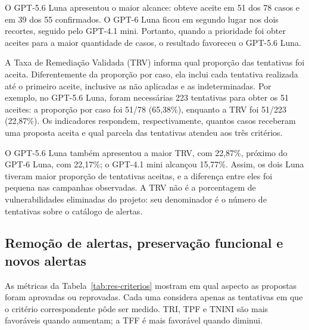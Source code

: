 O GPT-5.6 Luna apresentou o maior alcance: obteve aceite em 51 dos 78 casos e em 39 dos 55 confirmados. O GPT-6 Luna ficou em segundo lugar nos dois recortes, seguido pelo GPT-4.1 mini. Portanto, quando a prioridade foi obter aceites para a maior quantidade de casos, o resultado favoreceu o GPT-5.6 Luna.

A Taxa de Remediação Validada (TRV) informa qual proporção das tentativas foi aceita. Diferentemente da proporção por caso, ela inclui cada tentativa realizada até o primeiro aceite, inclusive as não aplicadas e as indeterminadas. Por exemplo, no GPT-5.6 Luna, foram necessárias 223 tentativas para obter os 51 aceites: a proporção por caso foi 51/78 (65,38\%), enquanto a TRV foi 51/223 (22,87\%). Os indicadores respondem, respectivamente, quantos casos receberam uma proposta aceita e qual parcela das tentativas atendeu aos três critérios.

O GPT-5.6 Luna também apresentou a maior TRV, com 22,87\%, próximo do GPT-6 Luna, com 22,17\%; o GPT-4.1 mini alcançou 15,77\%. Assim, os dois Luna tiveram maior proporção de tentativas aceitas, e a diferença entre eles foi pequena nas campanhas observadas. A TRV não é a porcentagem de vulnerabilidades eliminadas do projeto: seu denominador é o número de tentativas sobre o catálogo de alertas.

\subsection{Remoção de alertas, preservação funcional e novos alertas}

\label{sec:res-criterios}

As métricas da Tabela~\ref{tab:res-criterios} mostram em qual aspecto as propostas foram aprovadas ou reprovadas. Cada uma considera apenas as tentativas em que o critério correspondente pôde ser medido. TRI, TPF e TNINI são mais favoráveis quando aumentam; a TFF é mais favorável quando diminui.

